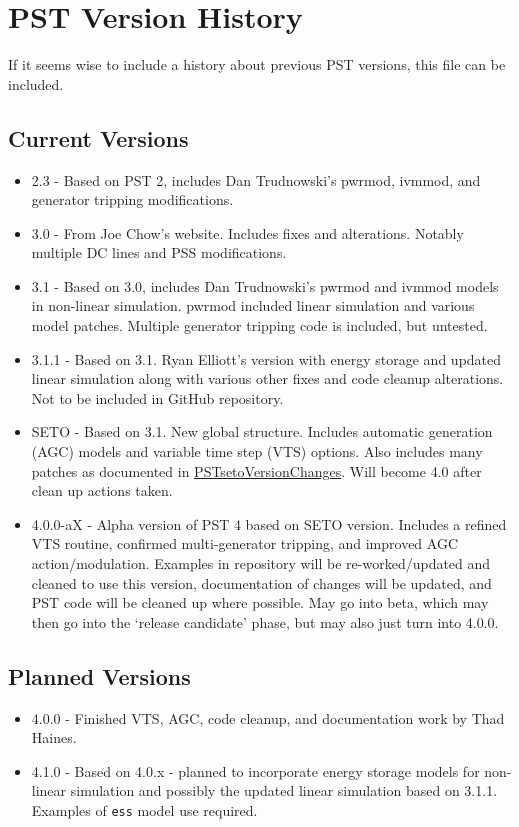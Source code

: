 \chapter*{PST Version History}

If it seems wise to include a history about previous PST versions, this file can be included.


\section*{Current Versions}
\begin{itemize}
\item 2.3 - Based on PST 2, includes Dan Trudnowski's pwrmod, ivmmod, and generator tripping modifications.
\item 3.0 - From Joe Chow's website. 
Includes fixes and alterations. 
Notably multiple DC lines and PSS modifications.
\item 3.1 - Based on 3.0, includes Dan Trudnowski's pwrmod and ivmmod models in non-linear simulation. 
pwrmod included linear simulation and various model patches. 
Multiple generator tripping code is included, but untested.
\item 3.1.1 - Based on 3.1. Ryan Elliott's version with energy storage and updated linear simulation along with various other fixes and code cleanup alterations. 
Not to be included in GitHub repository.
\item SETO - Based on 3.1. New global structure. 
Includes automatic generation (AGC) models and variable time step (VTS) options. 
Also includes many patches as documented in 
\href{https://github.com/thadhaines/MT-Tech-SETO/tree/master/researchDocs/TEX/one-offs/200709-PSTsetoVersionChanges}{PSTsetoVersionChanges}. 
% 
Will become 4.0 after clean up actions taken.
\item 4.0.0-aX - Alpha version of PST 4 based on SETO version. 
Includes a refined VTS routine, confirmed multi-generator tripping, and improved AGC action/modulation.
Examples in repository will be re-worked/updated and cleaned to use this version, 
documentation of changes will be updated, 
and PST code will be cleaned up where possible.
May go into beta, which may then go into the `release candidate' phase, but may also just turn into 4.0.0.

\end{itemize}

\section*{Planned Versions}
\begin{itemize}
\item 4.0.0 - Finished VTS, AGC, code cleanup, and documentation work by Thad Haines.
\item 4.1.0 - Based on 4.0.x - planned to incorporate energy storage models for non-linear simulation and possibly the updated linear simulation based on 3.1.1. Examples of \verb|ess| model use required.
\end{itemize}